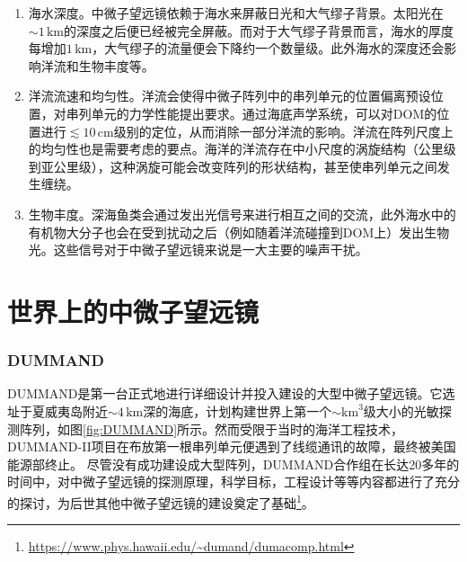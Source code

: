 \begin{enumerate}
    \item 海水深度。中微子望远镜依赖于海水来屏蔽日光和大气缪子背景。太阳光在$\sim 1\,\mathrm{km}$的深度之后便已经被完全屏蔽。而对于大气缪子背景而言，海水的厚度每增加$1\,\mathrm{km}$，大气缪子的流量便会下降约一个数量级\cite{atmos_muon_depth:1998}。此外海水的深度还会影响洋流和生物丰度等。

    \item 洋流流速和均匀性。洋流会使得中微子阵列中的串列单元的位置偏离预设位置，对串列单元的力学性能提出要求。通过海底声学系统，可以对DOM的位置进行$\lesssim 10\, \mathrm{cm}$级别的定位\cite{KM3NeT_acoustic_1:2022, KM3NeT_acoustic_2:2022, Baikal_acoustic:2021}，从而消除一部分洋流的影响。洋流在阵列尺度上的均匀性也是需要考虑的要点。海洋的洋流存在中小尺度的涡旋结构（公里级到亚公里级）\cite{current_simulation:2017}，这种涡旋可能会改变阵列的形状结构，甚至使串列单元之间发生缠绕。

    \item 生物丰度。深海鱼类会通过发出光信号来进行相互之间的交流，此外海水中的有机物大分子也会在受到扰动之后（例如随着洋流碰撞到DOM上）发出生物光\cite{biolumi_modeling:2021}。这些信号对于中微子望远镜来说是一大主要的噪声干扰\cite{ANTARES_biolumi:2021, Baikal_biolumi:2021}。
\end{enumerate}

\section{世界上的中微子望远镜}

\subsubsection*{DUMMAND}

DUMMAND\cite{DUMMAND:1992}是第一台正式地进行详细设计并投入建设的大型中微子望远镜。它选址于夏威夷岛附近$\sim 4 \,\mathrm{km}$深的海底，计划构建世界上第一个$\sim\mathrm{km}^3$级大小的光敏探测阵列，如图\ref{fig:DUMMAND}所示。然而受限于当时的海洋工程技术，DUMMAND-II项目在布放第一根串列单元便遇到了线缆通讯的故障，最终被美国能源部终止\cite{Telescope_history:2019}。
尽管没有成功建设成大型阵列，DUMMAND合作组在长达20多年的时间中，对中微子望远镜的探测原理，科学目标，工程设计等等内容都进行了充分的探讨，为后世其他中微子望远镜的建设奠定了基础\footnote{\url{https://www.phys.hawaii.edu/~dumand/dumacomp.html}}。

